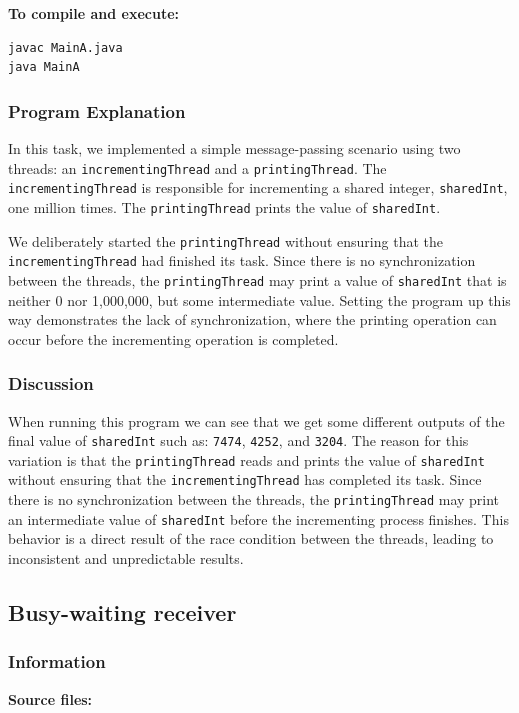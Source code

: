 \documentclass{article}
\begin{document}
\textbf{To compile and execute:}
\begin{lstlisting}[style=bash]
javac MainA.java
java MainA
\end{lstlisting}

\subsubsection{Program Explanation}
In this task, we implemented a simple message-passing scenario using two threads: an \texttt{incrementingThread} and a \texttt{printingThread}. The \texttt{incrementingThread} is responsible for incrementing a shared integer, \texttt{sharedInt}, one million times. The \texttt{printingThread} prints the value of \texttt{sharedInt}.

We deliberately started the \texttt{printingThread} without ensuring that the \\ \texttt{incrementingThread} had finished its task. Since there is no synchronization between the threads, the \texttt{printingThread} may print a value of \texttt{sharedInt} that is neither 0 nor 1,000,000, but some intermediate value. Setting the program up this way demonstrates the lack of synchronization, where the printing operation can occur before the incrementing operation is completed.

\subsubsection{Discussion}
When running this program we can see that we get some different outputs of the final value of \texttt{sharedInt} such as: \texttt{7474}, \texttt{4252}, and \texttt{3204}. The reason for this variation is that the \texttt{printingThread} reads and prints the value of \texttt{sharedInt} without ensuring that the \texttt{incrementingThread} has completed its task. Since there is no synchronization between the threads, the \texttt{printingThread} may print an intermediate value of \texttt{sharedInt} before the incrementing process finishes. This behavior is a direct result of the race condition between the threads, leading to inconsistent and unpredictable results.



\subsection{Busy-waiting receiver} \label{BusyWait}

\subsubsection{Information}
\textbf{Source files:}
\end{document}

